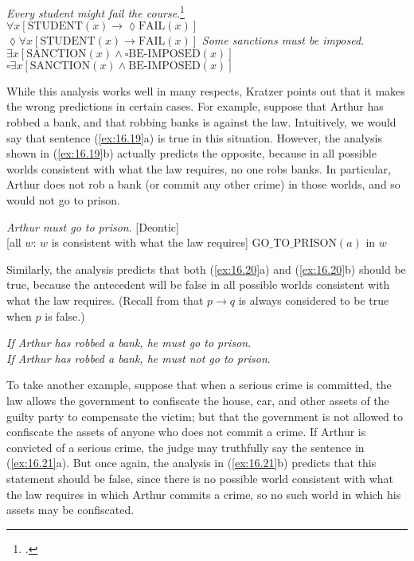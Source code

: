 \ea \label{ex:16.17}
\textit{Every student might fail the course}.\footnote{\citet[48]{Abbott2010}.}\\
\ea $\forall x[\text{STUDENT}(x) \rightarrow \lozenge \text{FAIL}(x)]$\\
\ex $\lozenge \forall x[\text{STUDENT}(x) \rightarrow \text{FAIL}(x)]$
   \z
\ex \label{ex:16.18}
\textit{Some sanctions must be imposed}.\\
\ea $\exists x[\text{SANCTION}(x) \wedge \square  \text{BE-IMPOSED}(x)]$\\
\ex $\square  \exists x[\text{SANCTION}(x) \wedge \text{BE-IMPOSED}(x)]$
     \z
\z


While this analysis works well in many respects, Kratzer points out that it makes the wrong predictions in certain cases. For example, suppose that Arthur has robbed a bank, and that robbing banks is against the law. Intuitively, we would say that sentence (\ref{ex:16.19}a) is true in this situation. However, the analysis shown in (\ref{ex:16.19}b) actually predicts the opposite, because in all possible worlds consistent with what the law requires, no one robs banks. In particular, Arthur does not rob a bank (or commit any other crime) in those worlds, and so would not go to prison.


\ea \label{ex:16.19}
\ea  \textit{Arthur must go to prison}. \hfill [Deontic]\\
\ex{} [all $w$: $w$ is consistent with what the law requires] $\text{GO\_TO\_PRISON}(a)$ in $w$
 \z
\z


Similarly, the analysis predicts that both (\ref{ex:16.20}a) and (\ref{ex:16.20}b) should be true, because the antecedent will be false in all possible worlds consistent with what the law requires. (Recall from  that $p\rightarrow q$ is always considered to be true when $p$ is false.)


\largerpage
\ea \label{ex:16.20}
\ea \textit{If Arthur has robbed a bank, he must go to prison}.\\
\ex \textit{If Arthur has robbed a bank, he must not go to prison}.
 \z
\z

To take another example, suppose that when a serious crime is committed, the law allows the government to confiscate the house, car, and other assets of the guilty party to compensate the victim; but that the government is not allowed to confiscate the assets of anyone who does not commit a crime. If Arthur is convicted of a serious crime, the judge may truthfully say the sentence in (\ref{ex:16.21}a). But once again, the analysis in (\ref{ex:16.21}b) predicts that this statement should be false, since there is no possible world consistent with what the law requires in which Arthur commits a crime, so no such world in which his assets may be confiscated.


